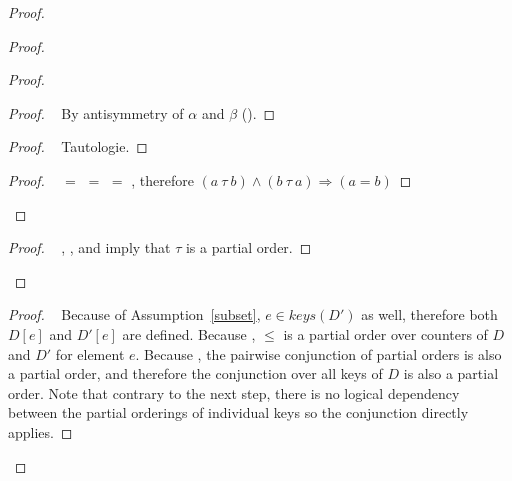 \documentclass[11pt, oneside]{article}   	%
\begin{document}
\begin{proof}
\begin{proof}
\begin{proof}
				\begin{proof}
					\pf~ By antisymmetry of $\alpha$ and $\beta$ ().
				\end{proof}
				
				\begin{proof}
					\pf~ Tautologie.
				\end{proof}
				
				\qedstep
				\begin{proof}
					\pf~   $=$  $=$  $=$ , therefore $(a ~\tau~ b) \wedge (b ~\tau~ a) \Rightarrow  (a=b)$
				\end{proof}
			\end{proof}
			
			\qedstep
			\begin{proof}
				\pf~ , , and  imply that $\tau$ is a partial order.
			\end{proof}
		\end{proof}
			
			\begin{proof}
				\pf~ Because of Assumption~\ref{subset}, $e \in \textit{keys}(D')$ as well, therefore both $D[e]$ and $D'[e]$ are defined. Because , $\leq$ is a partial order over counters of $D$ and $D'$ for element $e$. Because , the pairwise conjunction of partial orders is also a partial order, and therefore the conjunction over all keys of $D$ is also a partial order. Note that contrary to the next step, there is no logical dependency between the partial orderings of individual keys so the conjunction directly applies.
			\end{proof}
			

\end{proof}
\end{document}
